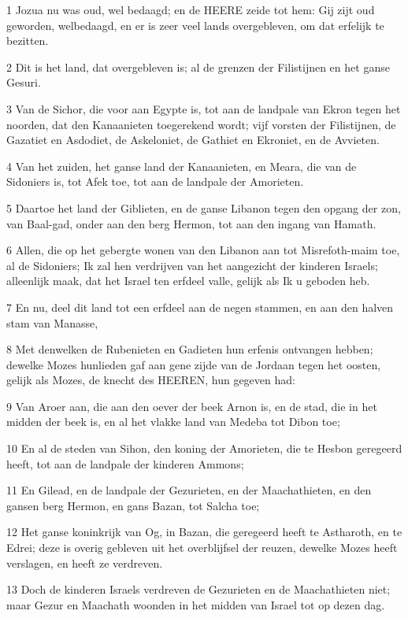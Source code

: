 \par 1 Jozua nu was oud, wel bedaagd; en de HEERE zeide tot hem: Gij zijt oud geworden, welbedaagd, en er is zeer veel lands overgebleven, om dat erfelijk te bezitten.
\par 2 Dit is het land, dat overgebleven is; al de grenzen der Filistijnen en het ganse Gesuri.
\par 3 Van de Sichor, die voor aan Egypte is, tot aan de landpale van Ekron tegen het noorden, dat den Kanaanieten toegerekend wordt; vijf vorsten der Filistijnen, de Gazatiet en Asdodiet, de Askeloniet, de Gathiet en Ekroniet, en de Avvieten.
\par 4 Van het zuiden, het ganse land der Kanaanieten, en Meara, die van de Sidoniers is, tot Afek toe, tot aan de landpale der Amorieten.
\par 5 Daartoe het land der Giblieten, en de ganse Libanon tegen den opgang der zon, van Baal-gad, onder aan den berg Hermon, tot aan den ingang van Hamath.
\par 6 Allen, die op het gebergte wonen van den Libanon aan tot Misrefoth-maim toe, al de Sidoniers; Ik zal hen verdrijven van het aangezicht der kinderen Israels; alleenlijk maak, dat het Israel ten erfdeel valle, gelijk als Ik u geboden heb.
\par 7 En nu, deel dit land tot een erfdeel aan de negen stammen, en aan den halven stam van Manasse,
\par 8 Met denwelken de Rubenieten en Gadieten hun erfenis ontvangen hebben; dewelke Mozes hunlieden gaf aan gene zijde van de Jordaan tegen het oosten, gelijk als Mozes, de knecht des HEEREN, hun gegeven had:
\par 9 Van Aroer aan, die aan den oever der beek Arnon is, en de stad, die in het midden der beek is, en al het vlakke land van Medeba tot Dibon toe;
\par 10 En al de steden van Sihon, den koning der Amorieten, die te Hesbon geregeerd heeft, tot aan de landpale der kinderen Ammons;
\par 11 En Gilead, en de landpale der Gezurieten, en der Maachathieten, en den gansen berg Hermon, en gans Bazan, tot Salcha toe;
\par 12 Het ganse koninkrijk van Og, in Bazan, die geregeerd heeft te Astharoth, en te Edrei; deze is overig gebleven uit het overblijfsel der reuzen, dewelke Mozes heeft verslagen, en heeft ze verdreven.
\par 13 Doch de kinderen Israels verdreven de Gezurieten en de Maachathieten niet; maar Gezur en Maachath woonden in het midden van Israel tot op dezen dag.
